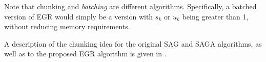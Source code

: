 \documentclass[11pt]{article}
\begin{document}
	Note that chunking and \emph{batching} are different algorithms. Specifically, a batched version of EGR would simply be a version with $s_k$ or $u_k$ being greater than 1, without reducing memory requirements. 
	 
A description of the chunking idea for the original SAG and SAGA algorithms, as well as to the proposed EGR algorithm is given in \cite{stefan-thesis}.
	   
%
%   
%
\end{document}
